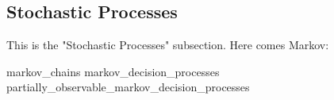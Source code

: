 \subsection{Stochastic Processes}

This is the "Stochastic Processes" subsection. Here comes Markov:

{markov_chains}
{markov_decision_processes}
{partially_observable_markov_decision_processes}
